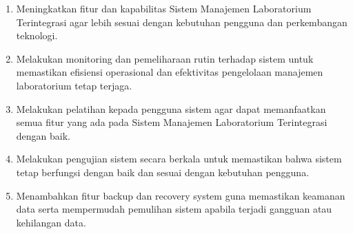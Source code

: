\begin{enumerate}
	\item Meningkatkan fitur dan kapabilitas Sistem Manajemen Laboratorium Terintegrasi agar lebih sesuai dengan kebutuhan pengguna dan perkembangan teknologi.
	\item Melakukan monitoring dan pemeliharaan rutin terhadap sistem untuk memastikan efisiensi operasional dan efektivitas pengelolaan manajemen laboratorium tetap terjaga.
	\item Melakukan pelatihan kepada pengguna sistem agar dapat memanfaatkan semua fitur yang ada pada Sistem Manajemen Laboratorium Terintegrasi dengan baik.
	\item Melakukan pengujian sistem secara berkala untuk memastikan bahwa sistem tetap berfungsi dengan baik dan sesuai dengan kebutuhan pengguna.
	\item Menambahkan fitur backup dan recovery system guna memastikan keamanan data serta mempermudah pemulihan sistem apabila terjadi gangguan atau kehilangan data.
\end{enumerate}